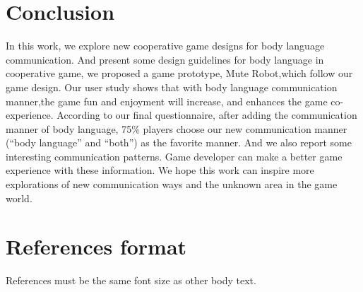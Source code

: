 \documentclass{sigchi}
\begin{document}
\section{Conclusion}

In this work, we explore new cooperative game designs for body language communication. 
  And present some design guidelines for body language in cooperative game, we proposed a game prototype, Mute Robot,which follow our game design. Our user study shows that with body language communication manner,the game fun and enjoyment will increase, and enhances the game co-experience. According to our final questionnaire, after adding the communication manner of body language, 75\% players choose our new communication manner (“body language” and “both”) as the favorite manner. And we also report some interesting communication patterns. Game developer can make a better game experience with these information. We hope this work can inspire more explorations of new communication ways and the unknown area in the game world.

\balance

\section{References format}
References must be the same font size as other body text.



\end{document}
